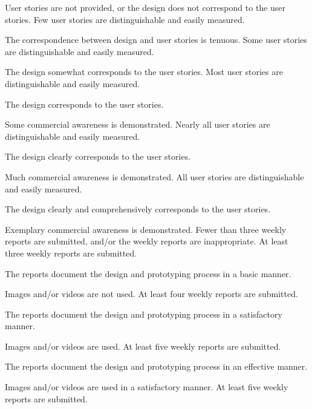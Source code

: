 \documentclass{../fal_assignment}
\begin{document}


\begin{markingrubric}
        \grade\fail User stories are not provided, or the design does not correspond to the user stories.
        \grade Few user stories are distinguishable and easily measured.
            \par The correspondence between design and user stories is tenuous.
        \grade Some user stories are distinguishable and easily measured.
            \par The design somewhat corresponds to the user stories.
        \grade Most user stories are distinguishable and easily measured.
            \par The design corresponds to the user stories.
            \par Some commercial awareness is demonstrated.
        \grade Nearly all user stories are distinguishable and easily measured.
            \par The design clearly corresponds to the user stories.
            \par Much commercial awareness is demonstrated.
        \grade All user stories are distinguishable and easily measured.
            \par The design clearly and comprehensively corresponds to the user stories.
            \par Exemplary commercial awareness is demonstrated.
        \grade\fail Fewer than three weekly reports are submitted,
            and/or the weekly reports are inappropriate.
        \grade At least three weekly reports are submitted.
            \par The reports document the design and prototyping process in a basic manner.
            \par Images and/or videos are not used.
        \grade At least four weekly reports are submitted.
            \par The reports document the design and prototyping process in a satisfactory manner.
            \par Images and/or videos are used.
        \grade At least five weekly reports are submitted.
            \par The reports document the design and prototyping process in an effective manner.
            \par Images and/or videos are used in a satisfactory manner.
        \grade At least five weekly reports are submitted.

\end{markingrubric}
\end{document}
